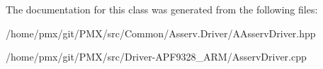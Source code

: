 The documentation for this class was generated from the following files\+:\begin{DoxyCompactItemize}
\item 
/home/pmx/git/\+P\+M\+X/src/\+Common/\+Asserv.\+Driver/A\+Asserv\+Driver.\+hpp\item 
/home/pmx/git/\+P\+M\+X/src/\+Driver-\/\+A\+P\+F9328\+\_\+\+A\+R\+M/Asserv\+Driver.\+cpp\end{DoxyCompactItemize}
